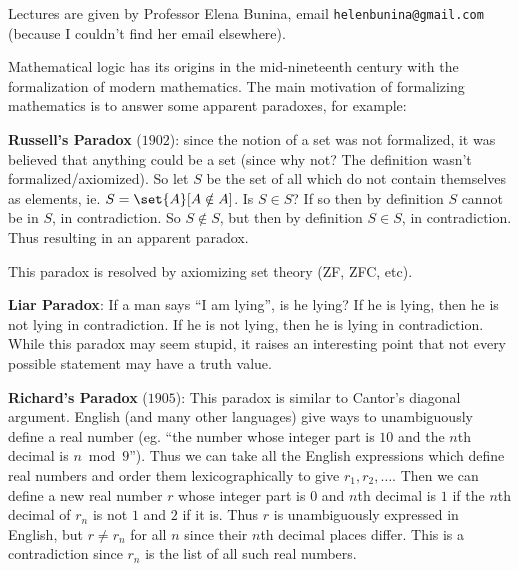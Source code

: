 \documentclass[10pt]{article}
\begin{document}


\bigskip

Lectures are given by Professor Elena Bunina, email {\tt helenbunina@gmail\!.\!com} (because I couldn't find her email elsewhere).

Mathematical logic has its origins in the mid-nineteenth century with the formalization of modern mathematics.
The main motivation of formalizing mathematics is to answer some apparent paradoxes, for example:

\benum
    \item \textbf{Russell's Paradox} ($1902$): since the notion of a set was not formalized, it was believed that anything could be a set (since why not? The definition wasn't formalized/axiomized).
    So let $S$ be the set of all which do not contain themselves as elements, ie. $S=\set{A}[A\notin A]$.
    Is $S\in S$?
    If so then by definition $S$ cannot be in $S$, in contradiction.
    So $S\notin S$, but then by definition $S\in S$, in contradiction.
    Thus resulting in an apparent paradox.

    This paradox is resolved by axiomizing set theory (ZF, ZFC, etc).

    \item \textbf{Liar Paradox}: If a man says ``I am lying'', is he lying?
    If he is lying, then he is not lying in contradiction.
    If he is not lying, then he is lying in contradiction.
    While this paradox may seem stupid, it raises an interesting point that not every possible statement may have a truth value.

    \item \textbf{Richard's Paradox} ($1905$): This paradox is similar to Cantor's diagonal argument.
    English (and many other languages) give ways to unambiguously define a real number (eg. ``the number whose integer part is $10$ and the $n$th decimal is
    $n\bmod9$'').
    Thus we can take all the English expressions which define real numbers and order them lexicographically to give $r_1,r_2,\dots$.
    Then we can define a new real number $r$ whose integer part is $0$ and $n$th decimal is $1$ if the $n$th decimal of $r_n$ is not $1$ and $2$ if it is.
    Thus $r$ is unambiguously expressed in English, but $r\neq r_n$ for all $n$ since their $n$th decimal places differ.
    This is a contradiction since $r_n$ is the list of all such real numbers.
\end{document}
